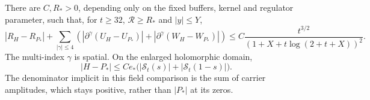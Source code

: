 \begin{theorem}\label{thm:full-saddle-static}
There are $C,R_*>0$, depending only on the fixed buffers, kernel and
regulator parameter, such that, for $t\ge32$, $\mathcal R\ge R_*$ and
$|y|\le Y$,
\begin{equation}
 |R_H-R_{P_*}|+
 \sum_{|\gamma|\le4}\left(
 |\partial^\gamma(U_H-U_{P_*})|
 +|\partial^\gamma(W_H-W_{P_*})|\right)
 \le C\frac{t^{3/2}}{(1+X+t\log(2+t+X))^2}.
 \label{eq:full-saddle-static}
\end{equation}
The multi-index $\gamma$ is spatial. On the enlarged holomorphic domain,
\begin{equation}
 |H-P_*|\le Ce_*\bigl(|\mathcal S_t(s)|+|\mathcal S_t(1-s)|\bigr).
 \label{eq:full-saddle-field}
\end{equation}
The denominator implicit in this field comparison is the sum of carrier
amplitudes, which stays positive, rather than $|P_*|$ at its zeros.
\end{theorem}

